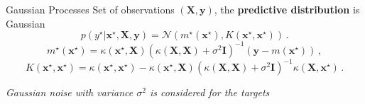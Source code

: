 \documentclass[aspectratio=149]{beamer}
\begin{document}
    \begin{frame}{Gaussian Processes}
    Set of observations \((\mathbf{X}, \mathbf{y})\), the \textbf{predictive distribution} is Gaussian
        \[
        p(y^\star | \mathbf{x}^\star, \mathbf{X}, \mathbf{y}) = \mathcal{N}(m^\star(\mathbf{x}^\star), K(\mathbf{x}^\star, \mathbf{x}^\star))\,.
        \]
        \pause
        \[
        m^\star(\mathbf{x}^\star) = \kappa(\mathbf{x}^\star, \mathbf{X})(\kappa(\mathbf{X}, \mathbf{X}) + \sigma^2 \bm{I})^{-1}(\mathbf{y} - m(\mathbf{x}^\star))\,,
        \]
        \[
        K(\mathbf{x}^\star, \mathbf{x}^\star) = \kappa(\mathbf{x}^\star, \mathbf{x}^\star) - \kappa(\mathbf{x}^\star, \mathbf{X})(\kappa(\mathbf{X}, \mathbf{X}) + \sigma^2 \bm{I})^{-1}\kappa(\mathbf{X},  \mathbf{x}^\star)\,.
        \]
        \begin{center}
            \emph{Gaussian noise with variance \(\sigma^2\) is considered for the targets}
        \end{center}
    \end{frame}
\end{document}

